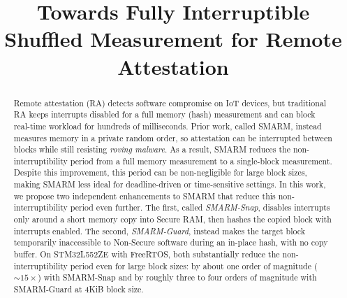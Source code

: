 \documentclass[conference]{IEEEtran}
\newcommand{\smarmcopy}{SMARM-Snap\xspace}
\newcommand{\smarmlock}{SMARM-Guard\xspace}
\begin{document}
\title{Towards Fully Interruptible Shuffled Measurement for Remote Attestation}

\author{
}

\maketitle

\begin{abstract}
Remote attestation (RA) detects software compromise on IoT devices, but
traditional RA keeps interrupts disabled for a full memory (hash) measurement and can block real-time workload for hundreds of milliseconds.
Prior work, called SMARM, instead measures memory in a private random order, so attestation can be interrupted between blocks while still resisting \emph{roving malware}.
As a result, SMARM reduces the non-interruptibility period from a full memory measurement to a single-block measurement.
Despite this improvement, this period can be non-negligible for large block sizes, making SMARM less ideal for deadline-driven or time-sensitive settings.
In this work, we propose two independent enhancements to SMARM that reduce this non-interruptibility period even further.
The first, called \emph{\smarmcopy}, disables interrupts only around a short memory copy into Secure RAM, then hashes the copied block with interrupts enabled.
The second, \emph{\smarmlock}, instead makes the target block temporarily inaccessible to Non-Secure software during an in-place hash, with no copy buffer.
On STM32L552ZE with FreeRTOS, both substantially reduce the non-interruptibility period even for large block sizes: by about one order of magnitude ($\sim\!\!15\times$) with \smarmcopy{} and by roughly three to four orders of magnitude with \smarmlock{} at 4KiB block size. 
\end{abstract}
\end{document}
